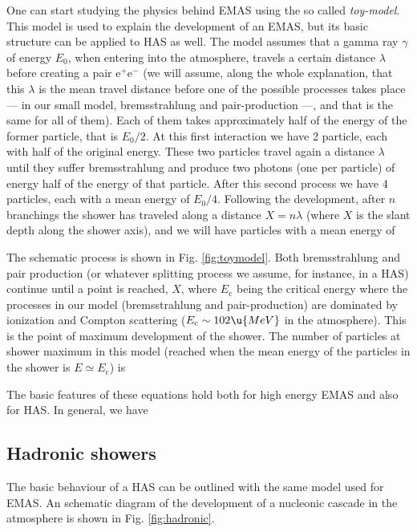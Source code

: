 One can start studying the physics behind EMAS using the so called
\emph{toy-model}. This model is used to explain the development of an
EMAS, but its basic structure can be applied to HAS as well. The model
assumes that a gamma ray $\gamma$ of energy $E_0$, when entering into
the atmosphere, travels a certain distance $\lambda$ before creating a
pair e$^+$e$^-$ (we will assume, along the whole explanation, that
this $\lambda$ is the mean travel distance before one of the possible
processes takes place --- in our small model, bremsstrahlung and
pair-production ---, and that is the same for all of them). Each of
them takes approximately half of the energy of the former particle,
that is $E_0/2$. At this first interaction we have 2 particle, each
with half of the original energy.  These two particles travel again a
distance $\lambda$ until they suffer bremsstrahlung and produce two
photons (one per particle) of energy half of the energy of that
particle.  After this second process we have 4 particles, each with a
mean energy of $E_0/4$.  Following the development, after $n$
branchings the shower has traveled along a distance $X=n\lambda$
(where $X$ is the slant depth along the shower axis), and we will have
%
\toyAeq
%
particles with a mean energy of
%
\toyBeq

The schematic process is shown in Fig.  \ref{fig:toymodel}.  Both
bremsstrahlung and pair production (or whatever splitting process we
assume, for instance, in a HAS) continue until a point is reached,
$X$, where
%
\toyCeq
%
$E_{\mathrm{c}}$ being the critical energy where the processes in our
model (bremsstrahlung and pair-production) are dominated by ionization
and Compton scattering ($E_{\mathrm{c}} \sim 102 \u{MeV}$ in the
atmosphere). This is the point of maximum development of the shower.
The number of particles at shower maximum in this model (reached when
the mean energy of the particles in the shower is $E\simeq
E_{\mathrm{c}}$) is
%
\toyDeq

\hadronicfig

The basic features of these equations hold both for high energy EMAS
and also for HAS. In general, we have
%
\NXsimpleeq

\subsection{Hadronic showers}

The basic behaviour of a HAS can be outlined with the same model used
for EMAS. An schematic diagram of the development of a nucleonic
cascade in the atmosphere is shown in Fig. \ref{fig:hadronic}.

